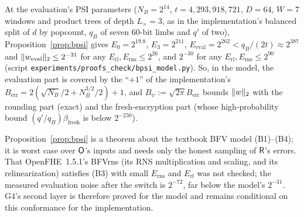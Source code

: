 \begin{corollary}\label{cor:bpsi}
At the evaluation's PSI parameters ($N_B=2^{14}$, $t=4{,}293{,}918{,}721$, $D=64$, $W=7$ windows and product trees of depth $L_\times=3$, as in the implementation's balanced split of $d$ by popcount, $q_B$ of seven $60$-bit limbs and $q'$ of two), Proposition~\ref{prop:bpsi} gives $E_0=2^{19.8}$, $E_3=2^{211}$, $E_{\mathrm{eval}}=2^{262}<q_B/(2t)\approx2^{387}$ and $\lVert w_{\mathrm{eval}}\rVert_2\le2^{-31}$ for any $E_{\mathrm{rl}},E_{\mathrm{rns}}\le2^{26}$, and $2^{-30}$ for any $E_{\mathrm{rl}},E_{\mathrm{rns}}\le2^{90}$ (script \texttt{experiments/proofs\_check/bpsi\_model.py}). So, in the model, the evaluation part is covered by the ``$+1$'' of the implementation's $B_{\mathrm{err}}=2(\sqrt{N_B}/2+N_B^{3/2}/2)+1$, and $B_\psi:=\sqrt{2\pi}B_{\mathrm{err}}$ bounds $\lVert w\rVert_2$ with the rounding part (exact) and the fresh-encryption part (whose high-probability bound $(q'/q_B)\beta_{\mathrm{fresh}}$ is below $2^{-250}$).
\end{corollary}

\begin{remark}
Proposition~\ref{prop:bpsi} is a theorem about the textbook BFV model (B1)--(B4); it is worst case over $\mathsf{O}$'s inputs and needs only the honest sampling of $\mathsf{R}$'s errors. That OpenFHE~1.5.1's BFVrns (its RNS multiplication and scaling, and its relinearization) satisfies (B3) with small $E_{\mathrm{rns}}$ and $E_{\mathrm{rl}}$ was not checked; the measured evaluation noise after the switch is $2^{-72}$, far below the model's $2^{-31}$. G4's second layer is therefore proved for the model and remains conditional on this conformance for the implementation.
\end{remark}
